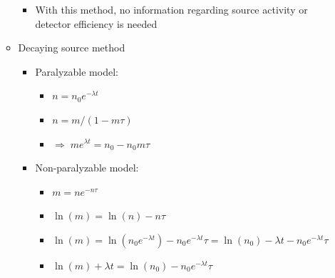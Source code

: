 \begin{enumerate}
\begin{itemize}
\begin{itemize}
            \item With this method, no information regarding source activity or detector efficiency is needed 
        \end{itemize}
        \item Decaying source method
        \begin{itemize}
            \item Paralyzable model:
            \begin{itemize}
                \item[] $n=n_0e^{-\lambda t}$
                \item[] $n=m/(1-m\tau)$
                \item[] $\Rightarrow\;me^{\lambda t}=n_0-n_0m\tau$
            \end{itemize}
            \item Non-paralyzable model:
            \begin{itemize}
                \item[] $m=ne^{-n\tau}$
                \item[] $\ln(m)=\ln(n)-n\tau$
                \item[] $\ln(m)=\ln(n_0e^{-\lambda t})-n_0e^{-\lambda t}\tau=\ln(n_0)-\lambda t-n_0e^{-\lambda t}\tau$
                \item[] $\ln(m)+\lambda t=\ln(n_0)-n_0 e^{-\lambda t}\tau$
            \end{itemize}
        \end{itemize}
    \end{itemize}
\end{enumerate}
